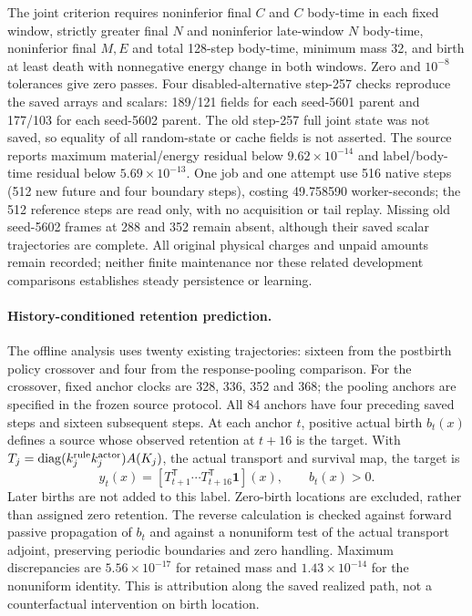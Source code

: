 The joint criterion requires noninferior final $C$ and $C$ body-time in each fixed window, strictly greater final $N$ and noninferior late-window $N$ body-time, noninferior final $M,E$ and total 128-step body-time, minimum mass 32, and birth at least death with nonnegative energy change in both windows. Zero and $10^{-8}$ tolerances give zero passes. Four disabled-alternative step-257 checks reproduce the saved arrays and scalars: 189/121 fields for each seed-5601 parent and 177/103 for each seed-5602 parent. The old step-257 full joint state was not saved, so equality of all random-state or cache fields is not asserted. The source reports maximum material/energy residual below $9.62\times10^{-14}$ and label/body-time residual below $5.69\times10^{-13}$. One job and one attempt use 516 native steps (512 new future and four boundary steps), costing 49.758590 worker-seconds; the 512 reference steps are read only, with no acquisition or tail replay. Missing old seed-5602 frames at 288 and 352 remain absent, although their saved scalar trajectories are complete. All original physical charges and unpaid amounts remain recorded; neither finite maintenance nor these related development comparisons establishes steady persistence or learning.

\paragraph{History-conditioned retention prediction.}The offline analysis uses twenty existing trajectories: sixteen from the postbirth policy crossover and four from the response-pooling comparison. For the crossover, fixed anchor clocks are 328, 336, 352 and 368; the pooling anchors are specified in the frozen source protocol. All 84 anchors have four preceding saved steps and sixteen subsequent steps. At each anchor $t$, positive actual birth $b_t(x)$ defines a source whose observed retention at $t+16$ is the target. With $T_j=\operatorname{diag}(k^{\rm rule}_j k^{\rm actor}_j)A(K_j)$, the actual transport and survival map, the target is
\[
y_t(x)=\left[T_{t+1}^{\mathsf T}\cdots T_{t+16}^{\mathsf T}\mathbf{1}\right](x),
\qquad b_t(x)>0.
\]
Later births are not added to this label. Zero-birth locations are excluded, rather than assigned zero retention. The reverse calculation is checked against forward passive propagation of $b_t$ and against a nonuniform test of the actual transport adjoint, preserving periodic boundaries and zero handling. Maximum discrepancies are $5.56\times10^{-17}$ for retained mass and $1.43\times10^{-14}$ for the nonuniform identity. This is attribution along the saved realized path, not a counterfactual intervention on birth location.

